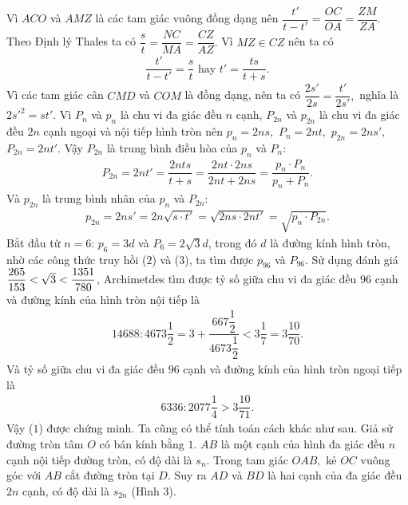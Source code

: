 \begin{multicols}{2}
	Vì $ACO$  và $AMZ$ là các tam giác vuông đồng dạng nên  $\dfrac{{t'}}{{t - t'}} = \dfrac{{OC}}{{OA}} = \dfrac{{ZM}}{{ZA}}.$
	\vskip 0.1cm
	Theo Định lý Thales ta có  $\dfrac{s}{t} = \dfrac{{NC}}{{MA}} = \dfrac{{CZ}}{{AZ}}.$
	\vskip 0.1cm
	Vì $MZ \in CZ$ nên ta có 
	\begin{align*}
		\dfrac{{t'}}{{t - t'}} = \dfrac{s}{t} \text{ hay } t' = \dfrac{{ts}}{{t + s}}.
	\end{align*}
	Vì các tam giác cân $CMD$  và  $COM$ là đồng dạng, nên ta có $\dfrac{{2s'}}{{2s}} = \dfrac{{t'}}{{2s'}},$  nghĩa là  $2{s'^2} = st'.$
	\vskip 0.1cm
	Vì $P_n$  và $p_n$  là chu vi đa giác đều $n$  cạnh, $P_{2n}$  và $p_{2n}$  là chu vi đa giác đều $2n$  cạnh ngoại và nội tiếp hình tròn nên ${p_n} = 2ns,$ ${P_n} = 2nt,$    ${p_{2n}} = 2ns',$   ${P_{2n}} = 2nt'.$
	\vskip 0.1cm
	Vậy $P_{2n}$   là trung bình điều hòa của  $p_n$ và $P_n$:
	\begin{align*}
		{P_{2n}} = 2nt' = \dfrac{{2nts}}{{t + s}} = \dfrac{{2nt \cdot 2ns}}{{2nt + 2ns}} = \dfrac{{{p_n} \cdot {P_n}}}{{{p_n} + {P_n}}}. \tag{$2$}
	\end{align*}
	Và $p_{2n}$ là trung bình nhân của $p_n$  và $P_{2n}$:  
	\begin{align*}
		{p_{2n}} = 2ns' = 2n\sqrt {s \cdot t'}  = \sqrt {2ns \cdot 2nt'}  = \sqrt {{p_n} \cdot {P_{2n}}} . \tag{$3$}
	\end{align*}
	Bắt đầu từ $n = 6$: $p_6 = 3d$ và $P_6 = 2\sqrt{3}d$,  trong đó $d$  là đường kính hình tròn, nhờ các công thức truy hồi ($2$) và ($3$), ta tìm được  $p_{96}$ và  $P_{96}$. Sử dụng đánh giá $\dfrac{{265}}{{153}}{\rm{ }} < \sqrt 3  < \dfrac{{1351}}{{780}}$,   Archimetdes tìm được tỷ số giữa chu vi đa giác đều $96$ cạnh và đường kính của hình tròn nội tiếp là 
	\begin{align*}
		14688:4673\dfrac{1}{2} = 3 + \dfrac{{667\dfrac{1}{2}}}{{4673\dfrac{1}{2}}} < 3\dfrac{1}{7} = 3\dfrac{{10}}{{70}}.
	\end{align*}
	Và tỷ số giữa chu vi đa giác đều $96$ cạnh và đường kính của hình tròn ngoại tiếp là
	\begin{align*}
		6336:2077\dfrac{1}{4} > 3\dfrac{{10}}{{71}}.
	\end{align*}
	Vậy ($1$) được chứng minh.
	\vskip 0.1cm
	Ta cũng có thể tính toán cách khác như sau.
	\vskip 0.1cm
	Giả sử đường tròn tâm $O$  có bán kính bằng $1$. $AB$  là một cạnh của hình đa giác đều $n$  cạnh nội tiếp đường tròn, có độ dài là $s_n$. Trong tam giác $OAB,$ kẻ $OC$  vuông góc với $AB$ cắt đường tròn tại  $D$. Suy ra $AD$ và $BD$  là hai cạnh của đa giác đều  $2n$ cạnh, có độ dài là  ${s_{2n}}$  (Hình $3$).
	

\end{multicols}
